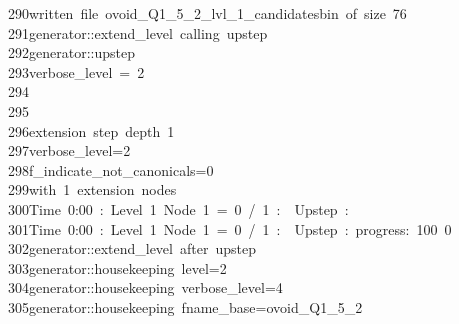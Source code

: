 \begin{tabbing}
290\>written\ file\ ovoid\_Q1\_5\_2\_lvl\_1\_candidatesbin\ of\ size\ 76\\[0pt]
291\>generator::extend\_level\ calling\ upstep\\[0pt]
292\>generator::upstep\\[0pt]
293\>verbose\_level\ =\ 2\\[0pt]
294\>\\[0pt]
295\>\\[0pt]
296\>extension\ step\ depth\ 1\\[0pt]
297\>verbose\_level=2\\[0pt]
298\>f\_indicate\_not\_canonicals=0\\[0pt]
299\>with\ 1\ extension\ nodes\\[0pt]
300\>Time\ 0:00\ :\ Level\ 1\ Node\ 1\ =\ 0\ /\ 1\ :\ \ Upstep\ :\ \\[0pt]
301\>Time\ 0:00\ :\ Level\ 1\ Node\ 1\ =\ 0\ /\ 1\ :\ \ Upstep\ :\ progress:\ 100\ 0\ \ \\[0pt]
302\>generator::extend\_level\ after\ upstep\\[0pt]
303\>generator::housekeeping\ level=2\\[0pt]
304\>generator::housekeeping\ verbose\_level=4\\[0pt]
305\>generator::housekeeping\ fname\_base=ovoid\_Q1\_5\_2\\[0pt]

\end{tabbing}

